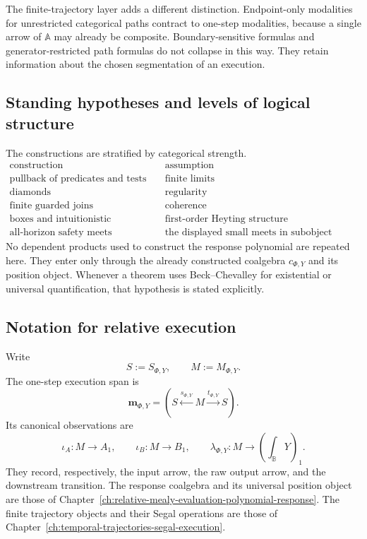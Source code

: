 The finite-trajectory layer adds a different distinction.  Endpoint-only
modalities for unrestricted categorical paths contract to one-step
modalities, because a single arrow of \(\mathbb A\) may already be composite.
Boundary-sensitive formulas and generator-restricted path formulas do not
collapse in this way.  They retain information about the chosen segmentation
of an execution.

\subsection{Standing hypotheses and levels of logical structure}
\label{subsec:dynamic-logical-hypotheses}

The constructions are stratified by categorical strength.
\[
\begin{array}{c|c}
\text{construction} & \text{assumption}\\
\hline
\text{pullback of predicates and tests} & \text{finite limits}\\
\text{diamonds} & \text{regularity}\\
\text{finite guarded joins} & \text{coherence}\\
\text{boxes and intuitionistic implication} &
\text{first-order Heyting structure}\\
\text{all-horizon safety meets} &
\text{the displayed small meets in subobject lattices}
\end{array}
\]
No dependent products used to construct the response polynomial are repeated
here.  They enter only through the already constructed coalgebra
\(c_{\Phi,Y}\) and its position object.  Whenever a theorem uses
Beck--Chevalley for existential or universal quantification, that hypothesis
is stated explicitly.

\subsection{Notation for relative execution}
\label{subsec:dynamic-relative-execution-notation}

Write
\[
    S:=S_{\Phi,Y},
    \qquad
    M:=M_{\Phi,Y}.
\]
The one-step execution span is
\[
    \mathbf m_{\Phi,Y}
    =
    \left(
    S\xleftarrow{s_{\Phi,Y}}M
    \xrightarrow{t_{\Phi,Y}}S
    \right).
\]
Its canonical observations are
\[
    \iota_A:M\to A_1,
    \qquad
    \iota_B:M\to B_1,
    \qquad
    \lambda_{\Phi,Y}:
    M\to\left(\int_{\mathbb B}Y\right)_1.
\]
They record, respectively, the input arrow, the raw output arrow, and the
downstream transition.  The response coalgebra and its universal position
object are those of
Chapter~\ref{ch:relative-mealy-evaluation-polynomial-response}.  The finite
trajectory objects and their Segal operations are those of
Chapter~\ref{ch:temporal-trajectories-segal-execution}.

